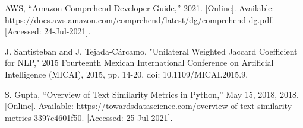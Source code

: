 \documentclass[conference]{style/IEEEtran}
\begin{document}
\begin{thebibliography}{00}
 AWS, “Amazon Comprehend Developer Guide,” 2021. [Online]. Available: https://docs.aws.amazon.com/comprehend/latest/dg/comprehend-dg.pdf. [Accessed: 24-Jul-2021].


 J. Santisteban and J. Tejada-Cárcamo, "Unilateral Weighted Jaccard Coefficient for NLP," 2015 Fourteenth Mexican International Conference on Artificial Intelligence (MICAI), 2015, pp. 14-20, doi: 10.1109/MICAI.2015.9.

  S. Gupta, “Overview of Text Similarity Metrics in Python,” May 15, 2018, 2018. [Online]. Available: https://towardsdatascience.com/overview-of-text-similarity-metrics-3397c4601f50. [Accessed: 25-Jul-2021].

\end{thebibliography}

\vspace{12pt}
\end{document}
